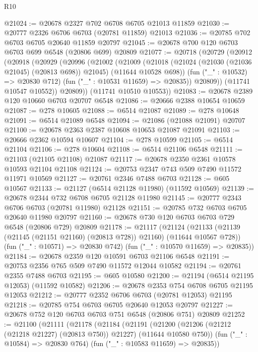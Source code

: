 \begin{lexlean}{R10}
\begin{coremodule}
@21024 := @20678 @2327 @702 @6708 @6705 @21013 @11859
@21030 := @20777 @2326 @6706 @6703 (@20781 @11859) @21013
@21036 := @20785 @702 @6703 @6705 @20640 @11859 @20797
@21045 := @20678 @700 @120 @6703 @6703 @699 @6548 (@20806 @699) @20809
@21077 := @20718
    (@20729
      (@20912
        (@20918
          (@20929
            (@20996
              (@21002
                (@21009
                  (@21018
                    (@21024 (@21030 (@21036 @21045) (@20813 @698)) @21045)
                    (@11644 @10528 @698))
                  (fun ("_" : @10532) => @20830 @712)
                  (fun ("_" : @10531 @11659) => @20835))
                @20809))
            (@11741 @10547 @10552))
          @20809))
      (@11741 @10510 @10553))
@21083 := @20678 @2389 @120 @10660 @6703 @20707 @6548
@21086 := @20666 @2388 @10654 @10659
@21087 := @278 @10605
@21088 := @6514 @21087
@21089 := @278 @10648
@21091 := @6514 @21089 @6548
@21094 := @21086 (@21088 @21091) @20707
@21100 := @20678 @2363 @2387 @10608 @10653 @21087 @21091
@21103 := @20666 @2362 @10594 @10607
@21104 := @278 @10599
@21105 := @6514 @21104
@21106 := @278 @10604
@21108 := @6514 @21106 @6548
@21111 := @21103 (@21105 @21108) @21087
@21117 := @20678 @2350 @2361 @10578 @10593 @21104 @21108
@21124 := @20753 @2347 @743 @509 @7490 @11572 @11971 @10569
@21127 := @20761 @2346 @7488 @6703
@21128 := @605 @10567
@21133 := @21127 (@6514 @21128 @11980) (@11592 @10569)
@21139 := @20678 @2344 @732 @6708 @6705 @21128 @11980
@21145 := @20777 @2343 @6706 @6703 (@20781 @11980) @21128
@21151 := @20785 @732 @6703 @6705 @20640 @11980 @20797
@21160 := @20678 @730 @120 @6703 @6703 @729 @6548 (@20806 @729) @20809
@21178 := @21117
    (@21124
      (@21133 (@21139 (@21145 (@21151 @21160) (@20813 @728)) @21160) (@11644 @10567 @728))
      (fun ("_" : @10571) => @20830 @742)
      (fun ("_" : @10570 @11659) => @20835))
@21184 := @20678 @2359 @120 @10591 @6703 @21106 @6548
@21191 := @20753 @2356 @765 @509 @7490 @11572 @12044 @10582
@21194 := @20761 @2355 @7488 @6703
@21195 := @605 @10580
@21200 := @21194 (@6514 @21195 @12053) (@11592 @10582)
@21206 := @20678 @2353 @754 @6708 @6705 @21195 @12053
@21212 := @20777 @2352 @6706 @6703 (@20781 @12053) @21195
@21218 := @20785 @754 @6703 @6705 @20640 @12053 @20797
@21227 := @20678 @752 @120 @6703 @6703 @751 @6548 (@20806 @751) @20809
@21252 := @21100
    (@21111
      (@21178
        (@21184
          (@21191
            (@21200 (@21206 (@21212 (@21218 @21227) (@20813 @750)) @21227) (@11644 @10580 @750))
            (fun ("_" : @10584) => @20830 @764)
            (fun ("_" : @10583 @11659) => @20835))

\end{coremodule}
\end{lexlean}
